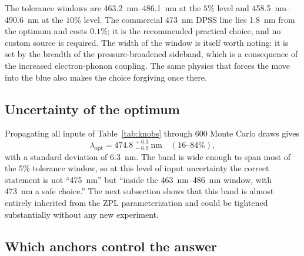 \documentclass[preprint,12pt]{elsarticle}
\newcommand{\lopt}{\ensuremath{\lambda_{\mathrm{opt}}}}
\begin{document}
The tolerance windows are \SIrange{463.2}{486.1}{\nano\meter} at the $5\%$ level
and \SIrange{458.5}{490.6}{\nano\meter} at the $10\%$ level. The commercial
\SI{473}{\nano\meter} DPSS line lies \SI{1.8}{\nano\meter} from the optimum and
costs $0.1\%$; it is the recommended practical choice, and no custom source is
required. The width of the window is itself worth noting: it is set by the
breadth of the pressure-broadened sideband, which is a consequence of the
increased electron-phonon coupling. The same physics that forces the move into
the blue also makes the choice forgiving once there.

\subsection{Uncertainty of the optimum}
\label{sec:resultsA:mc}

Propagating all inputs of Table~\ref{tab:knobs} through $600$ Monte Carlo draws
gives
\begin{equation}
  \lopt = 474.8^{\,+6.3}_{\,-6.9}\ \si{\nano\meter}
  \quad (16\text{--}84\%),
\end{equation}
with a standard deviation of \SI{6.3}{\nano\meter}. The band is wide enough to
span most of the $5\%$ tolerance window, so at this level of input uncertainty
the correct statement is not ``\SI{475}{\nano\meter}'' but ``inside the
\SIrange{463}{486}{\nano\meter} window, with \SI{473}{\nano\meter} a safe
choice.'' The next subsection shows that this band is almost entirely inherited
from the ZPL parameterization and could be tightened substantially without any
new experiment.

\subsection{Which anchors control the answer}
\label{sec:resultsA:tornado}
\end{document}
